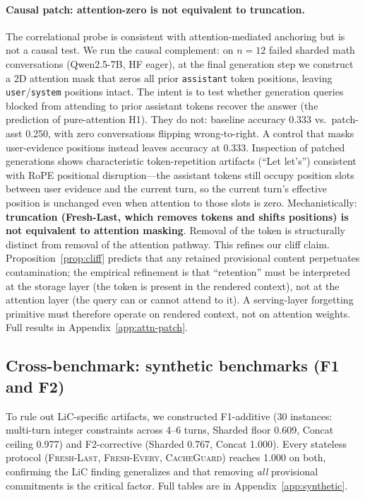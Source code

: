 \documentclass{article}
\begin{document}
\paragraph{Causal patch: attention-zero is not equivalent to truncation.}
The correlational probe is consistent with attention-mediated anchoring but is not a causal test. We run the causal complement: on $n{=}12$ failed sharded math conversations (Qwen2.5-7B, HF eager), at the final generation step we construct a 2D attention mask that zeros all prior \texttt{assistant} token positions, leaving \texttt{user}/\texttt{system} positions intact. The intent is to test whether generation queries blocked from attending to prior assistant tokens recover the answer (the prediction of pure-attention H1). They do not: baseline accuracy 0.333 vs.\ patch-asst 0.250, with zero conversations flipping wrong-to-right. A control that masks user-evidence positions instead leaves accuracy at 0.333. Inspection of patched generations shows characteristic token-repetition artifacts (``Let let's'') consistent with RoPE positional disruption---the assistant tokens still occupy position slots between user evidence and the current turn, so the current turn's effective position is unchanged even when attention to those slots is zero. Mechanistically: \textbf{truncation (Fresh-Last, which removes tokens and shifts positions) is not equivalent to attention masking}. Removal of the token is structurally distinct from removal of the attention pathway. This refines our cliff claim. Proposition~\ref{prop:cliff} predicts that any retained provisional content perpetuates contamination; the empirical refinement is that ``retention'' must be interpreted at the storage layer (the token is present in the rendered context), not at the attention layer (the query can or cannot attend to it). A serving-layer forgetting primitive must therefore operate on rendered context, not on attention weights. Full results in Appendix~\ref{app:attn-patch}.

\subsection{Cross-benchmark: synthetic benchmarks (F1 and F2)}
\label{sec:f1-synthetic}

To rule out LiC-specific artifacts, we constructed F1-additive (30 instances: multi-turn integer constraints across 4--6 turns, Sharded floor 0.609, Concat ceiling 0.977) and F2-corrective (Sharded 0.767, Concat 1.000). Every stateless protocol (\textsc{Fresh-Last}, \textsc{Fresh-Every}, \textsc{CacheGuard}) reaches 1.000 on both, confirming the LiC finding generalizes and that removing \emph{all} provisional commitments is the critical factor. Full tables are in Appendix~\ref{app:synthetic}.
\end{document}
